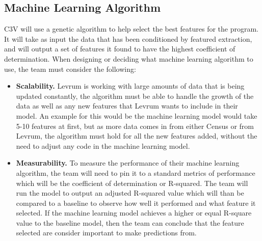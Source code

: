 \documentclass[onecolumn, draftclsnofoot,10pt, compsoc]{IEEEtran}
\begin{document}
\begin{singlespace}
\section{Machine Learning Algorithm} \label{machine_learning_algorithm}
C3V will use a genetic algorithm to help select the best features for the program.
It will take as input the data that has been conditioned by featured extraction, and will output a set of features it found to have the highest coefficient of determination.
When designing or deciding what machine learning algorithm to use, the team must consider the following:
\begin{itemize}
	\item \textbf{Scalability.} Levrum is working with large amounts of data that is being updated constantly, the algorithm must be able to handle the growth of the data as well as any new features that Levrum wants to include in their model.
	An example for this would be the machine learning model would take 5-10 features at first, but as more data comes in from either Census or from Levrum, the algorithm must hold for all the new features added, without the need to adjust any code in the machine learning model.
	\item \textbf{Measurability.} To measure the performance of their machine learning algorithm, the team will need to pin it to a standard metrics of performance which will be the coefficient of determination or R-squared. 
	The team will run the model to output an adjusted R-squared value which will than be compared to a baseline to observe how well it performed and what feature it selected.
	If the machine learning model achieves a higher or equal R-square value to the baseline model, then the team can conclude that the feature selected are consider important to make predictions from.
\end{itemize}

\end{singlespace}
\end{document}
